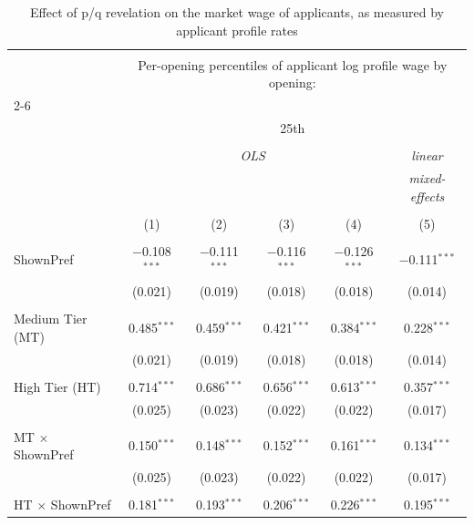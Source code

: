 
\begin{table}[!htbp] \centering 
  \caption{Effect of p/q revelation on the market wage of applicants, as measured by applicant profile rates} 
  \label{tab:pr_rate_percentiles} 
\begin{tabular}{@{\extracolsep{5pt}}lccccc} 
\\[-1.8ex]\hline 
\hline \\[-1.8ex] 
 & \multicolumn{5}{c}{Per-opening percentiles of applicant log profile wage by opening:} \\ 
\cline{2-6} 
\\[-1.8ex] & \multicolumn{5}{c}{25th} \\ 
\\[-1.8ex] & \multicolumn{4}{c}{\textit{OLS}} & \textit{linear} \\ 
 & \multicolumn{4}{c}{\textit{}} & \textit{mixed-effects} \\ 
\\[-1.8ex] & (1) & (2) & (3) & (4) & (5)\\ 
\hline \\[-1.8ex] 
 ShownPref & $-$0.108$^{***}$ & $-$0.111$^{***}$ & $-$0.116$^{***}$ & $-$0.126$^{***}$ & $-$0.111$^{***}$ \\ 
  & (0.021) & (0.019) & (0.018) & (0.018) & (0.014) \\ 
  & & & & & \\ 
 Medium Tier (MT) & 0.485$^{***}$ & 0.459$^{***}$ & 0.421$^{***}$ & 0.384$^{***}$ & 0.228$^{***}$ \\ 
  & (0.021) & (0.019) & (0.018) & (0.018) & (0.014) \\ 
  & & & & & \\ 
 High Tier (HT) & 0.714$^{***}$ & 0.686$^{***}$ & 0.656$^{***}$ & 0.613$^{***}$ & 0.357$^{***}$ \\ 
  & (0.025) & (0.023) & (0.022) & (0.022) & (0.017) \\ 
  & & & & & \\ 
 MT $\times$ ShownPref & 0.150$^{***}$ & 0.148$^{***}$ & 0.152$^{***}$ & 0.161$^{***}$ & 0.134$^{***}$ \\ 
  & (0.025) & (0.023) & (0.022) & (0.022) & (0.017) \\ 
  & & & & & \\ 
 HT $\times$ ShownPref & 0.181$^{***}$ & 0.193$^{***}$ & 0.206$^{***}$ & 0.226$^{***}$ & 0.195$^{***}$ \\ 

\end{tabular}
\end{table}
